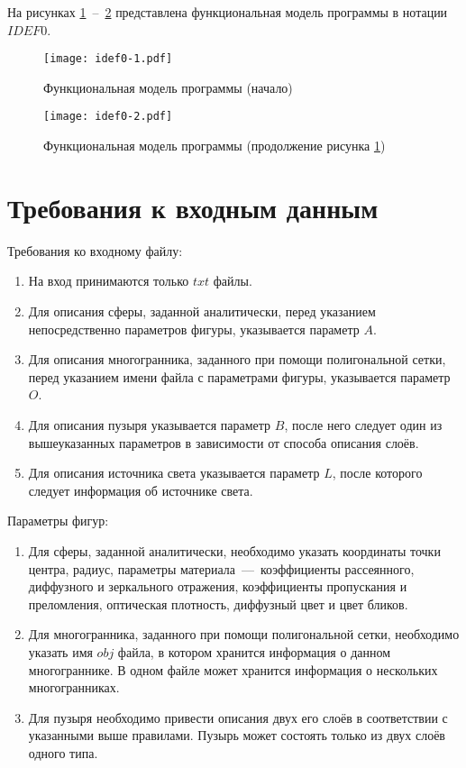 На рисунках \ref{img:idef0-1}~--~\ref{img:idef0-2} представлена функциональная модель программы в нотации $IDEF0$.

\begin{figure}[h!]
    \centering
    \texttt{[image: idef0-1.pdf]}
    \caption{Функциональная модель программы (начало)}
    \label{img:idef0-1}
\end{figure}

\begin{figure}[h!]
    \centering
    \texttt{[image: idef0-2.pdf]}
    \caption{Функциональная модель программы (продолжение рисунка \ref{img:idef0-1})}
    \label{img:idef0-2}
\end{figure}

\section{Требования к входным данным}
Требования ко входному файлу:
\begin{enumerate}[label={\arabic*)}]
	\item На вход принимаются только $txt$ файлы.
	\item Для описания сферы, заданной аналитически, перед указанием непосредственно параметров фигуры, указывается параметр $A$.
	\item Для описания многогранника, заданного при помощи полигональной сетки, перед указанием имени файла с параметрами фигуры, указывается параметр $O$.
	\item Для описания пузыря указывается параметр $B$, после него следует один из вышеуказанных параметров в зависимости от способа описания слоёв.
	\item Для описания источника света указывается параметр $L$, после которого следует информация об источнике света.
\end{enumerate}

Параметры фигур:
\begin{enumerate}[label={\arabic*)}]
	\item Для сферы, заданной аналитически, необходимо указать координаты точки центра, радиус, параметры материала~---~коэффициенты рассеянного, диффузного и зеркального отражения, коэффициенты пропускания и преломления, оптическая плотность, диффузный цвет и цвет бликов.
	\item Для многогранника, заданного при помощи полигональной сетки, необходимо указать имя $obj$ файла, в котором хранится информация о данном многограннике. В одном файле может хранится информация о нескольких многогранниках.
	\item Для пузыря необходимо привести описания двух его слоёв в соответствии с указанными выше правилами. Пузырь может состоять только из двух слоёв одного типа.
\end{enumerate}

